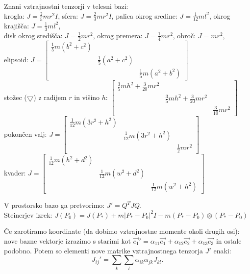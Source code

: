\documentclass[a4paper,10pt]{article}
\theoremstyle{definition}
\newcommand{\Pt}{P_{\ast}}
\begin{document}
Znani vztrajnostni tenzorji v telesni bazi: \\
krogla: $J = \frac25mr^2I$, sfera: $J = \frac23mr^2I$, palica okrog sredine:
$J = \frac{1}{12}ml^2$, okrog krajišča: $J = \frac{1}{3}ml^2$, \\disk okrog
središča: $J = \frac12mr^2$, okrog premera: $J = \frac14mr^2$, obroč: $J =
mr^2$, \\
elipsoid: $J =
  \begin{bmatrix}
    \frac15m(b^2+c^2) & & \\ & \frac15(a^2+c^2) & \\ & & \frac15m(a^2+b^2)
  \end{bmatrix}$ \\
stožec ($\bigtriangledown$) z radijem $r$ in višino $h$:
  $\begin{bmatrix}
    \frac35 mh^2+\frac{3}{20}mr^2 & & \\ & \frac35mh^2 + \frac{3}{20}mr^2 & \\
    & & \frac{3}{10}mr^2
  \end{bmatrix}$ \\
pokončen valj:
  $J = \begin{bmatrix}
    \frac{1}{12}m(3r^2+h^2) & & \\ & \frac{1}{12}m(3r^2 + h^2) & \\ & &
    \frac12 mr^2
  \end{bmatrix}$ \\
kvader:
  $J = \begin{bmatrix}
    \frac{1}{12}m(h^2+d^2) &  &  \\  & \frac{1}{12}m(w^2+d^2) &  \\  &  &
    \frac{1}{12}m(w^2 + h^2)
  \end{bmatrix}$

V prostorsko bazo ga pretvorimo: $J' = Q^TJQ$. \\
Steinerjev izrek: $J(P_0) = J(\Pt) + m|\Pt - P_0|^2I - m(\Pt - P_0) \otimes (\Pt
- P_0)$

Če zarotiramo koordinate (da dobimo vztrajnostne momente okoli drugih osi): nove bazne vektorje izrazimo s starimi kot $\vec{e_1}' = \alpha_{11} \vec{e_1} + \alpha_{12} \vec{e_2} + \alpha_{13} \vec{e_3}$ in ostale podobno. Potem so elementi nove matrike vztrajnostnega tenzorja $J'$ enaki:
$$J_{ij}' = \sum_k \sum_l \alpha_{ik} \alpha_{jk} J_{kl}.$$
\end{document}
